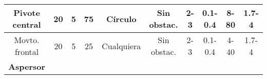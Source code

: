 \begin{table}[h!]
\begin{turn}{90}
\begin{tabular}{c|c|c|c|c|c|c|c|c|c}
			\multicolumn{1}{|c|}{Pivote central}                                             & \multicolumn{1}{c|}{20}                                                                   & \multicolumn{1}{c|}{5}                                                                 & \multicolumn{1}{c|}{75}  & \multicolumn{1}{c|}{Círculo}                                                     & \multicolumn{1}{c|}{Sin obstac.}                                                    & \multicolumn{1}{c|}{2-3}                                                               & \multicolumn{1}{c|}{0.1-0.4}                                                       & \multicolumn{1}{c|}{8-80}                                                         & \multicolumn{1}{c|}{1.7-4}                                                                \\ \midrule
			\multicolumn{1}{|c|}{Movto. frontal}                                             & \multicolumn{1}{c|}{20}                                                                   & \multicolumn{1}{c|}{5}                                                                 & \multicolumn{1}{c|}{25}  & \multicolumn{1}{c|}{Cualquiera}                                                  & \multicolumn{1}{c|}{Sin obstac.}                                                    & \multicolumn{1}{c|}{2-3}                                                               & \multicolumn{1}{|c|}{0.1-0.4}                                                      & \multicolumn{1}{|c|}{4-40}                                                        & \multicolumn{1}{|c|}{1.7-4}                                                               \\ \midrule
			\multicolumn{1}{|c|}{\textbf{Aspersor}}                                          & \multicolumn{1}{|c|}{}                                                                    & \multicolumn{1}{|c|}{}                                                                 & \multicolumn{1}{|c|}{}   & \multicolumn{1}{c|}{}                                                            & \multicolumn{1}{c|}{}                                                               & \multicolumn{1}{|c|}{}                                                                 & \multicolumn{1}{|c|}{}                                                             & \multicolumn{1}{|c|}{}                                                            & \multicolumn{1}{|c|}{}                                                                    \\ \midrule

\end{tabular}
\end{turn}
\end{table}
